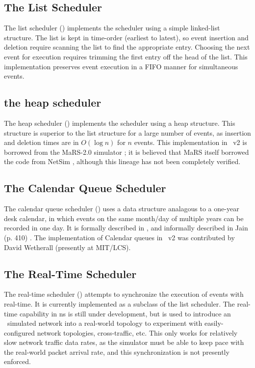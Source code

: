 \subsection{The List Scheduler}
\label{sec:listsched}

The list scheduler ()
implements the scheduler using a simple linked-list structure.
The list is kept in time-order (earliest to latest), so event
insertion and deletion require scanning the list to find the
appropriate entry.
Choosing the next event for execution requires trimming the first
entry off the head of the list.
This implementation preserves event execution in a FIFO manner
for simultaneous events.

\subsection{the heap scheduler}
\label{sec:heapsched}

The heap scheduler ()
implements the scheduler using a heap structure.
This structure is superior to the list structure for a large number
of events, as insertion and deletion times are in $O(\log n)$
for $n$ events.
This implementation in \ns~v2 is borrowed from the
MaRS-2.0 simulator \cite{Alae94:Design};
it is believed that MaRS itself borrowed the code
from NetSim \cite{Heyb89:Netsim},
although this lineage has not been completely verified.

\subsection{The Calendar Queue Scheduler}
\label{sec:cqsched}

The calendar queue scheduler
()
uses a data structure analagous to a one-year desk calendar,
in which events on the same month/day of multiple years can be recorded in
one day.
It is formally described in \cite{calendarqueue}, and informally described
in Jain (p. 410) \cite{Jain}.
The implementation of Calendar queues in \ns~v2
was contributed by David Wetherall (presently at MIT/LCS).

\subsection{The Real-Time Scheduler}
\label{sec:rtsched}

The real-time scheduler ()
attempts to synchronize the execution of events with real-time.
It is currently implemented as a subclass of the list scheduler.
The real-time capability in ns is still under development, but is used
to introduce an \ns\ simulated network into a real-world topology
to experiment with easily-configured network topologies, cross-traffic, etc. 
This only works for relatively slow network traffic data rates, as the
simulator must be able to keep pace with the real-world packet arrival
rate, and this synchronization is not presently enforced.

